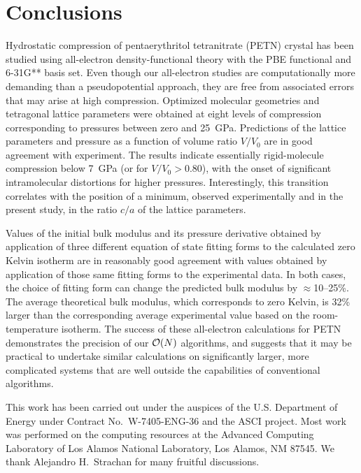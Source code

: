\documentclass[prb,aps,nobibnotes,twocolumn,doublespace,twocolumngrid,superbib]{revtex4}
\begin{document}
\section{Conclusions}
\label{sec:conclusions}
Hydrostatic compression of pentaerythritol tetranitrate (PETN) crystal
has been studied using all-electron density-functional theory with the
PBE functional and 6-31G** basis set. Even though our all-electron
studies are computationally more demanding than a pseudopotential
approach, they are free from associated errors that may arise 
at high compression.  Optimized molecular
geometries and tetragonal lattice parameters were obtained at eight
levels of compression corresponding to pressures between zero and
25~GPa.  Predictions of the lattice parameters and pressure as a
function of volume ratio $V/V_0$ are in good agreement with
experiment. The results indicate essentially rigid-molecule
compression below 7~GPa (or for $V/V_0 > 0.80$), with the onset of
significant intramolecular distortions for higher pressures.  
Interestingly, this transition correlates with the position of a
minimum, observed experimentally and in the present study, in the 
ratio $c/a$ of the lattice parameters.

Values of the initial bulk modulus and its pressure derivative
obtained by application of three different equation of state fitting
forms to the calculated zero Kelvin isotherm are in reasonably good
agreement with values obtained by application of those same fitting
forms to the experimental data.  In both cases, the choice of fitting
form can change the predicted bulk modulus by $\approx$10--25\%.  The
average theoretical bulk modulus, which corresponds to zero Kelvin,
is 32\% larger than the corresponding average experimental value based
on the room-temperature isotherm.  The success of these all-electron
calculations for PETN demonstrates the precision of our ${\cal O}(N)$ 
algorithms, and suggests that it may be practical to undertake 
similar calculations on significantly larger, more complicated systems 
that are well outside the capabilities of conventional algorithms. 

\begin{acknowledgments}
This work has been carried out under the auspices of the
U.S. Department of Energy under Contract No.~W-7405-ENG-36 and the
ASCI project.  Most work was performed on the computing resources at
the Advanced Computing Laboratory of Los Alamos National Laboratory,
Los Alamos, NM 87545.  We thank Alejandro H.~Strachan for many
fruitful discussions.
\end{acknowledgments}
\end{document}
